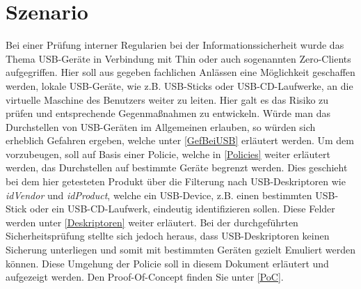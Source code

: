 			\chapter{Szenario}
Bei einer Prüfung interner Regularien bei der Informationssicherheit wurde das Thema USB-Geräte in Verbindung mit Thin oder auch sogenannten Zero-Clients aufgegriffen. Hier soll aus gegeben fachlichen Anlässen eine Möglichkeit geschaffen werden, lokale USB-Geräte, wie z.B. USB-Sticks oder USB-CD-Laufwerke, an die virtuelle Maschine des Benutzers weiter zu leiten. Hier galt es das Risiko zu prüfen und entsprechende Gegenmaßnahmen zu entwickeln. 
Würde man das Durchstellen von USB-Geräten im Allgemeinen erlauben, so würden sich erheblich Gefahren ergeben, welche unter \ref{GefBeiUSB} erläutert werden. Um dem vorzubeugen, soll auf Basis einer Policie, welche in \ref{Policies} weiter erläutert werden, das Durchstellen auf bestimmte Geräte begrenzt werden. Dies geschieht bei dem hier getesteten Produkt über die Filterung nach USB-Deskriptoren wie \textit{idVendor} und \textit{idProduct}, welche ein USB-Device, z.B. einen bestimmten USB-Stick oder ein USB-CD-Laufwerk, eindeutig identifizieren sollen. Diese Felder werden unter \ref{Deskriptoren} weiter erläutert.
Bei der durchgeführten Sicherheitsprüfung stellte sich jedoch heraus, dass USB-Deskriptoren keinen Sicherung unterliegen und somit mit bestimmten Geräten gezielt Emuliert werden können. Diese Umgehung der Policie soll in diesem Dokument erläutert und aufgezeigt werden. Den Proof-Of-Concept finden Sie unter \ref{PoC}.

